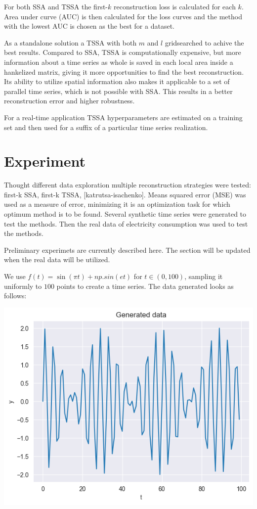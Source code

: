 \documentclass{article}
\begin{document}
For both SSA and TSSA the first-\(k\) reconstruction loss is calculated for each \(k\). Area under curve (AUC) is then calculated for the loss curves and the method with the lowest AUC is chosen as the best for a dataset.

As a standalone solution a TSSA with both \(m\) and \(l\) gridsearched to achive the best results. Compared to SSA, TSSA is computationally expensive, but more information about a time series as whole is saved in each local area inside a hankelized matrix, giving it more opportunities to find the best reconstruction. Its ability to utilize spatial information also makes it applicable to a set of parallel time series, which is not possible with SSA. This results in a better reconstruction error and higher robustness.

For a real-time application TSSA hyperparameters are estimated on a training set and then used for a suffix of a particular time series realization.

\section{Experiment}

Thought different data exploration multiple reconstruction strategies were tested: first-k SSA, first-k TSSA, [katrutsa-isachenko]. Means squared error (MSE) was used as a measure of error, minimizing it is an optimization task for which optimum method is to be found. Several synthetic time series were generated to test the methods. Then the real data of electricity consumption was used to test the methods.

Preliminary experimets are currently described here. The section will be updated when the real data will be utilized.

We use \(f(t) = \sin(\pi t) + np.sin(et)\) for \(t \in (0, 100)\), sampling it uniformly to \(100\) points to create a time series. The data generated looks as follows:

\includegraphics[scale=0.7]{./images/fig1.png}
\end{document}
